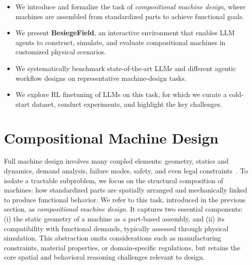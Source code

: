 \documentclass{article} %
\newcommand{\envname}{\textbf{BesiegeField}\xspace}
\theoremstyle{plain}
\theoremstyle{definition}
\begin{document}
\vspace{-1mm}
\begin{itemize}[leftmargin=*,nosep]
\setlength\itemsep{0.35em}
    \item We introduce and formalize the task of \emph{compositional machine design}, where machines are assembled from standardized parts to achieve functional goals.
    \item We present \envname, an interactive environment 
    that enables LLM agents to construct, simulate, and evaluate compositional machines in customized physical scenarios.
    \item We systematically benchmark state-of-the-art LLMs and different agentic workflow designs on representative machine-design tasks.
    \item We explore RL finetuning of LLMs on this task, for which we curate a cold-start dataset, conduct experiments, and highlight the key challenges.
\end{itemize}

\vspace{-2mm}
\section{Compositional Machine Design}
\vspace{-2mm}




Full machine design involves many coupled elements: geometry, statics and dynamics, demand analysis, failure modes, safety, and even legal constraints~\citep{beitz1996engineering,wong2025llm}. To isolate a tractable subproblem, we focus on the structural composition of machines: how standardized parts are spatially arranged and mechanically linked to produce functional behavior. We refer to this task, introduced in the previous section, as \emph{compositional machine design}. It captures two essential components: (i) the static geometry of a machine as a part-based assembly, and (ii) its compatibility with functional demands, typically assessed through physical simulation. This abstraction omits considerations such as manufacturing constraints, material properties, or domain-specific regulations, but retains the core spatial and behavioral reasoning challenges relevant to design.
\end{document}
